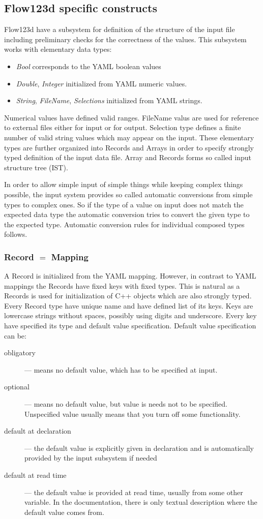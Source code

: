 \subsection{Flow123d specific constructs}
Flow123d have a subsystem for definition of the structure of the input file including preliminary checks for the 
correctness of the values. This subsystem works with elementary data types:
\begin{itemize}
 \item {\it Bool} corresponds to the YAML boolean values
 \item {\it Double}, {\it Integer} initialized from YAML numeric values. 
 \item {\it String}, {\it FileName}, {\it Selections} initialized from YAML strings.
\end{itemize}
Numerical values have defined valid ranges. FileName valus are used for reference to external files either for input or for output.
Selection type defines a finite number of valid string values which may appear on the input. 
These elementary types are further organized into Records and Arrays in order to specify strongly typed definition of the 
input data file. Array and Records forms so called input structure tree (IST).

In order to allow simple input of simple things while keeping complex things possible, the input system provides
so called automatic conversions from simple types to complex ones. 
So if the type of a value on input does not match the expected data type the automatic conversion tries to convert 
the given type to the expected type. Automatic conversion rules for individual composed types follows.

\subsubsection{Record $=$ Mapping}
A Record is initialized from the YAML mapping. However, in contrast to YAML mappings 
the Records have fixed keys with fixed types. 
This is natural as a Records is used for initialization of C++ objects which 
are also strongly typed. Every Record type have unique name and have defined list of its keys.
Keys are lowercase strings without spaces, possibly using digits and underscore. Every key have 
specified its type and default value specification. Default value specification can be:
\begin{description} 
 \item[obligatory] --- means no default value, which has to be specified at input. 
 \item[optional] --- means no default value, but value is needs not to be specified. Unspecified value usually means that you turn off some functionality.
 \item[default at declaration] --- the default value is explicitly given in declaration and is automatically provided by the input subsystem if needed
 \item[default at read time] --- the default value is provided at read time, usually from some other variable. In the documentation, 
 there is only textual description where the default value comes from.
\end{description}

